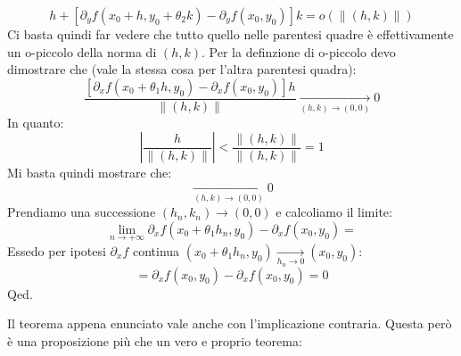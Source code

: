 {	\begin{equation*}
		[\partial_x f(x_0 + \theta_1 h, y_0) - \partial_x f(x_0, y_0) ]h + [\partial_y f(x_0 + h, y_0 + \theta_2 k) - \partial_y f(x_0, y_0)]k = o(\lVert (h, k) \rVert)
	\end{equation*}
	Ci basta quindi far vedere che tutto quello nelle parentesi quadre è effettivamente un o-piccolo della norma di $(h, k)$. Per la definzione di o-piccolo devo dimostrare che (vale la stessa cosa per l'altra parentesi quadra):
	\begin{equation*}
		\dfrac{[\partial_x f(x_0 + \theta_1 h, y_0) - \partial_x f(x_0, y_0) ]h}{\lVert (h, k) \rVert} \xrightarrow[(h, k) \to (0, 0)] {} 0
	\end{equation*}
	In quanto:
	\begin{equation*}
		\left | \dfrac{h}{\lVert (h, k) \rVert} \right | < \dfrac{\lVert (h, k) \rVert}{\lVert (h, k) \rVert} = 1
	\end{equation*}
	Mi basta quindi mostrare che:
	\begin{equation*}
		[\partial_x f(x_0 + \theta_1 h, y_0) - \partial_x f(x_0, y_0) ] \xrightarrow[(h, k) \to (0, 0)]{} 0
	\end{equation*}
	Prendiamo una successione $(h_n, k_n) \to (0, 0)$ e calcoliamo il limite:
	\begin{equation*}
		\lim_{n \to +\infty} \partial_x f(x_0 + \theta_1 h_n, y_0) - \partial_x f(x_0, y_0) =
	\end{equation*}
	Essedo per ipotesi $\partial_x f$ continua $(x_0 + \theta_1 h_n, y_0) \xrightarrow[h_n \to 0]{} (x_0, y_0)$:
	\begin{equation*}
		= \partial_x f(x_0, y_0) - \partial_x f(x_0, y_0) = 0
	\end{equation*}
	\hfill Qed.
}

Il teorema appena enunciato vale anche con l'implicazione contraria. Questa però è una proposizione più che un vero e proprio teorema:

